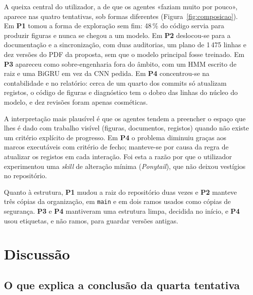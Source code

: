 \documentclass[11pt,a4paper]{article}
\newcommand{\Pum}{\textbf{P1}}
\newcommand{\Pdois}{\textbf{P2}}
\newcommand{\Ptres}{\textbf{P3}}
\newcommand{\Pquatro}{\textbf{P4}}
\begin{document}
A queixa central do utilizador, a de que os agentes «faziam muito por pouco», aparece nas quatro
tentativas, sob formas diferentes (Figura~\ref{fig:composicao}). Em \Pum{} tomou a forma de
exploração sem fim: 48\,\% do código servia para produzir figuras e nunca se chegou a um modelo.
Em \Pdois{} deslocou-se para a documentação e a sincronização, com duas auditorias, um plano de
1\,475 linhas e dez versões do PDF da proposta, sem que o modelo principal fosse treinado. Em
\Ptres{} apareceu como sobre-engenharia fora do âmbito, com um HMM escrito de raiz e uma BiGRU em
vez da CNN pedida. Em \Pquatro{} concentrou-se na contabilidade e no relatório: cerca de um quarto
dos commits só atualizam registos, o código de figuras e diagnóstico tem o dobro das linhas do
núcleo do modelo, e dez revisões foram apenas cosméticas.

A interpretação mais plausível é que os agentes tendem a preencher o espaço que lhes é dado com
trabalho visível (figuras, documentos, registos) quando não existe um critério explícito de
progresso. Em \Pquatro{} o problema diminuiu graças aos marcos executáveis com critério de fecho;
manteve-se por causa da regra de atualizar os registos em cada interação. Foi esta a razão por que
o utilizador experimentou uma \emph{skill} de alteração mínima (\emph{Ponytail}), que não deixou
vestígios no repositório.

Quanto à estrutura, \Pum{} mudou a raiz do repositório duas vezes e \Pdois{} manteve três cópias da
organização, em \texttt{main} e em dois ramos usados como cópias de segurança. \Ptres{} e
\Pquatro{} mantiveram uma estrutura limpa, decidida no início, e \Pquatro{} usou etiquetas, e não
ramos, para guardar versões antigas.

\section{Discussão}\label{sec:discussao}

\subsection{O que explica a conclusão da quarta tentativa}
\end{document}
